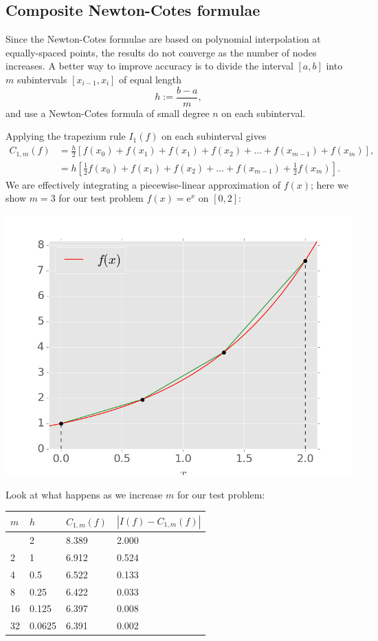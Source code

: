 \documentclass[
  letterpaper,
  DIV=11,
  numbers=noendperiod]{scrreprt}
\newenvironment{fbxSimple}[3]{\begin{tcolorbox}[enhanced, breakable,%
attach boxed title to top*={xshift=1.4pt},
boxed title style={boxrule=0.0mm, fuzzy shadow={1pt}{-1pt}{0mm}{0.1mm}{gray}, arc=.3em, rounded corners=east, sharp corners=west}, colframe=#1-color2, colbacktitle=#1-color1, colback = white, coltitle=black,  titlerule=0mm, toprule=0pt, bottomrule=.7pt, leftrule=.3em, rightrule=.7pt, outer arc=.3em,  	left=.5em, right=.5em, bottomtitle=1mm, toptitle=1mm,title=\textbf{#2}\hspace{0.5em}{#3}]}
{\end{tcolorbox}}
\begin{document}
\subsection{Composite Newton-Cotes
formulae}\label{composite-newton-cotes-formulae}

Since the Newton-Cotes formulae are based on polynomial interpolation at
equally-spaced points, the results do not converge as the number of
nodes increases. A better way to improve accuracy is to divide the
interval \([a,b]\) into \(m\) subintervals \([x_{i-1},x_i]\) of equal
length \[
h := \frac{b-a}{m},
\] and use a Newton-Cotes formula of small degree \(n\) on each
subinterval.

\label{composite-trapezium-rule}
\begin{fbxSimple}{eg}{Example 4.10: }{Composite trapezium rule}
\label{composite-trapezium-rule}
Applying the trapezium rule \(I_1(f)\) on each subinterval gives \[
\begin{aligned}
C_{1,m}(f) &= \frac{h}{2}\left[f(x_0) + f(x_1) + f(x_1) + f(x_2) + \ldots + f(x_{m-1}) + f(x_m) \right],\\
&= h\left[\tfrac12 f(x_0) + f(x_1) + f(x_2) + \ldots + f(x_{m-1}) + \tfrac12 f(x_m) \right].
\end{aligned}
\] We are effectively integrating a piecewise-linear approximation of
\(f(x)\); here we show \(m=3\) for our test problem
\(f(x)=\mathrm{e}^x\) on \([0,2]\):

\begin{center}
\includegraphics[width=0.75\linewidth,height=\textheight,keepaspectratio]{im/comptrapz.png}
\end{center}

Look at what happens as we increase \(m\) for our test problem:

\begin{longtable}[]{@{}llll@{}}
\toprule\noalign{}
\(m\) & \(h\) & \(C_{1,m}(f)\) & \(|I(f) - C_{1,m}(f)|\) \\
\midrule\noalign{}
\endhead
\bottomrule\noalign{}
\endlastfoot
1 & 2 & 8.389 & 2.000 \\
2 & 1 & 6.912 & 0.524 \\
4 & 0.5 & 6.522 & 0.133 \\
8 & 0.25 & 6.422 & 0.033 \\
16 & 0.125 & 6.397 & 0.008 \\
32 & 0.0625 & 6.391 & 0.002 \\
\end{longtable}


\end{fbxSimple}
\end{document}
